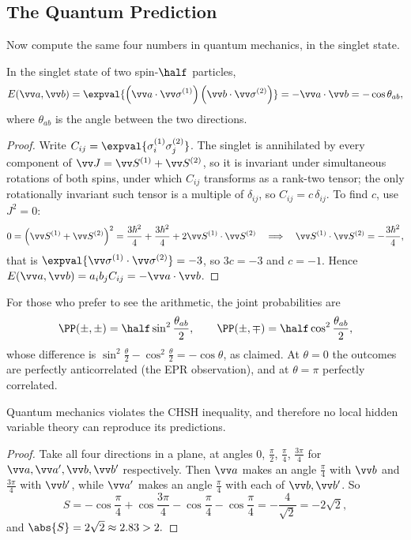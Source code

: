 \subsection{The Quantum Prediction}

Now compute the same four numbers in quantum mechanics, in the singlet state.

\begin{proposition}
    In the singlet state of two spin-$\half$ particles,
    $$
    E(\vv a, \vv b) = \expval{\left( \vv a \cdot \vv\sigma^{(1)}\right)\left( \vv b \cdot \vv\sigma^{(2)}\right)} = - \vv a \cdot \vv b = -\cos\theta_{ab},
    $$
    where $\theta_{ab}$ is the angle between the two directions.
\end{proposition}
\begin{proof}
    Write $C_{ij} = \expval{\sigma_i^{(1)}\sigma_j^{(2)}}$. The singlet is annihilated by every component of $\vv J = \vv S^{(1)} + \vv S^{(2)}$, so it is invariant under simultaneous rotations of both spins, under which $C_{ij}$ transforms as a rank-two tensor; the only rotationally invariant such tensor is a multiple of $\delta_{ij}$, so $C_{ij} = c\,\delta_{ij}$. To find $c$, use $J^2 = 0$:
    $$
    0 = \left(\vv S^{(1)}+\vv S^{(2)}\right)^2 = \frac{3\hbar^2}{4}+\frac{3\hbar^2}{4} + 2\vv S^{(1)}\cdot\vv S^{(2)} \quad\Longrightarrow\quad \vv S^{(1)}\cdot\vv S^{(2)} = -\frac{3\hbar^2}{4},
    $$
    that is $\expval{\vv\sigma^{(1)}\cdot\vv\sigma^{(2)}} = -3$, so $3c = -3$ and $c = -1$. Hence $E(\vv a,\vv b) = a_ib_jC_{ij} = -\vv a \cdot \vv b$.
\end{proof}

For those who prefer to see the arithmetic, the joint probabilities are
$$
\PP(\pm,\pm) = \half\sin^2\frac{\theta_{ab}}{2}, \qquad \PP(\pm,\mp) = \half\cos^2\frac{\theta_{ab}}{2},
$$
whose difference is $\sin^2\frac\theta2 - \cos^2\frac\theta2 = -\cos\theta$, as claimed. At $\theta = 0$ the outcomes are perfectly anticorrelated (the EPR observation), and at $\theta = \pi$ perfectly correlated.

\begin{corollary}
    Quantum mechanics violates the CHSH inequality, and therefore no local hidden variable theory can reproduce its predictions.
\end{corollary}
\begin{proof}
    Take all four directions in a plane, at angles $0$, $\frac\pi2$, $\frac\pi4$, $\frac{3\pi}{4}$ for $\vv a, \vv a', \vv b, \vv b'$ respectively. Then $\vv a$ makes an angle $\frac\pi4$ with $\vv b$ and $\frac{3\pi}{4}$ with $\vv b'$, while $\vv a'$ makes an angle $\frac\pi4$ with each of $\vv b, \vv b'$. So
    $$
    S = -\cos\frac\pi4 + \cos\frac{3\pi}{4} - \cos\frac\pi4 - \cos\frac\pi4 = -\frac{4}{\sqrt2} = -2\sqrt2,
    $$
    and $\abs{S} = 2\sqrt2 \approx 2.83 > 2. \qedhere$
\end{proof}

